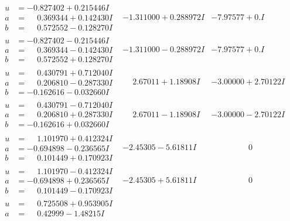 \documentclass[1p]{elsarticle_modified}
\theoremstyle{definition}
\begin{document}
$$\begin{array}{c|c|c}
 \hline 
\begin{aligned}
u &= -0.827402 + 0.215446 I \\
a &= \phantom{-}0.369344 + 0.142430 I \\
b &= \phantom{-}0.572552 - 0.128270 I\end{aligned}
 & -1.311000 + 0.288972 I & -7.97577 + 0. I\phantom{ +0.000000I} \\ \hline\begin{aligned}
u &= -0.827402 - 0.215446 I \\
a &= \phantom{-}0.369344 - 0.142430 I \\
b &= \phantom{-}0.572552 + 0.128270 I\end{aligned}
 & -1.311000 - 0.288972 I & -7.97577 + 0. I\phantom{ +0.000000I} \\ \hline\begin{aligned}
u &= \phantom{-}0.430791 + 0.712040 I \\
a &= \phantom{-}0.206810 - 0.287330 I \\
b &= -0.162616 - 0.032660 I\end{aligned}
 & \phantom{-}2.67011 + 1.18908 I & -3.00000 + 2.70122 I \\ \hline\begin{aligned}
u &= \phantom{-}0.430791 - 0.712040 I \\
a &= \phantom{-}0.206810 + 0.287330 I \\
b &= -0.162616 + 0.032660 I\end{aligned}
 & \phantom{-}2.67011 - 1.18908 I & -3.00000 - 2.70122 I \\ \hline\begin{aligned}
u &= \phantom{-}1.101970 + 0.412324 I \\
a &= -0.694898 - 0.236565 I \\
b &= \phantom{-}0.101449 + 0.170923 I\end{aligned}
 & -2.45305 - 5.61811 I & \phantom{-0.000000 } 0 \\ \hline\begin{aligned}
u &= \phantom{-}1.101970 - 0.412324 I \\
a &= -0.694898 + 0.236565 I \\
b &= \phantom{-}0.101449 - 0.170923 I\end{aligned}
 & -2.45305 + 5.61811 I & \phantom{-0.000000 } 0 \\ \hline\begin{aligned}
u &= \phantom{-}0.725508 + 0.953905 I \\
a &= \phantom{-}0.42999 - 1.48215 I \\

\end{aligned}
\end{array}$$
\end{document}
